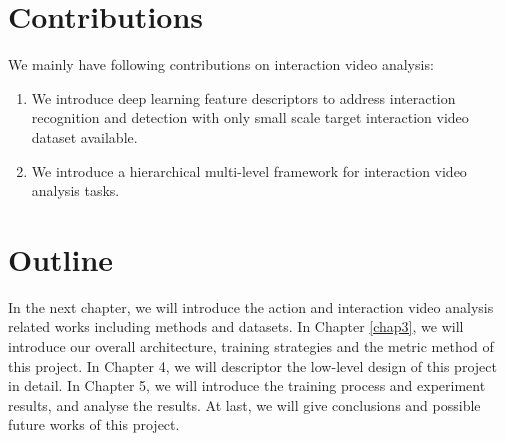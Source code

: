 \section{Contributions}
\label{sec:intro_sec03}

We mainly have following contributions on interaction video analysis: 
\begin{enumerate}
	\item We introduce deep learning feature descriptors to address interaction recognition and detection with only small scale target interaction video dataset available. 
	\item We introduce a hierarchical multi-level framework for interaction video analysis tasks.
\end{enumerate}

\section{Outline}
\label{sec:intro_outline}
In the next chapter, we will introduce the action and interaction video analysis related works including methods and datasets. In Chapter \ref{chap3}, we will introduce our overall architecture, training strategies and the metric method of this project. In Chapter 4, we will descriptor the low-level design of this project in detail. In Chapter 5, we will introduce the training process and experiment results, and analyse the results. At last, we will give conclusions and possible future works of this project.
